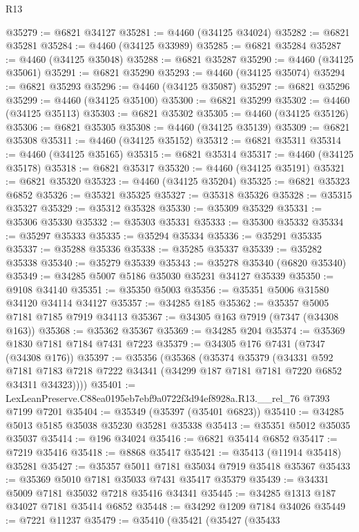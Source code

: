 \begin{lexlean}{R13}
\begin{coremodule}
@35279 := @6821 @34127
@35281 := @4460 (@34125 @34024)
@35282 := @6821 @35281
@35284 := @4460 (@34125 @33989)
@35285 := @6821 @35284
@35287 := @4460 (@34125 @35048)
@35288 := @6821 @35287
@35290 := @4460 (@34125 @35061)
@35291 := @6821 @35290
@35293 := @4460 (@34125 @35074)
@35294 := @6821 @35293
@35296 := @4460 (@34125 @35087)
@35297 := @6821 @35296
@35299 := @4460 (@34125 @35100)
@35300 := @6821 @35299
@35302 := @4460 (@34125 @35113)
@35303 := @6821 @35302
@35305 := @4460 (@34125 @35126)
@35306 := @6821 @35305
@35308 := @4460 (@34125 @35139)
@35309 := @6821 @35308
@35311 := @4460 (@34125 @35152)
@35312 := @6821 @35311
@35314 := @4460 (@34125 @35165)
@35315 := @6821 @35314
@35317 := @4460 (@34125 @35178)
@35318 := @6821 @35317
@35320 := @4460 (@34125 @35191)
@35321 := @6821 @35320
@35323 := @4460 (@34125 @35204)
@35325 := @6821 @35323 @6852
@35326 := @35321 @35325
@35327 := @35318 @35326
@35328 := @35315 @35327
@35329 := @35312 @35328
@35330 := @35309 @35329
@35331 := @35306 @35330
@35332 := @35303 @35331
@35333 := @35300 @35332
@35334 := @35297 @35333
@35335 := @35294 @35334
@35336 := @35291 @35335
@35337 := @35288 @35336
@35338 := @35285 @35337
@35339 := @35282 @35338
@35340 := @35279 @35339
@35343 := @35278 @35340 (@6820 @35340)
@35349 := @34285 @5007 @5186 @35030 @35231 @34127 @35339
@35350 := @9108 @34140
@35351 := @35350 @5003
@35356 := @35351 @5006 @31580 @34120 @34114 @34127
@35357 := @34285 @185
@35362 := @35357 @5005 @7181 @7185 @7919 @34113
@35367 := @34305 @163 @7919 (@7347 (@34308 @163))
@35368 := @35362 @35367
@35369 := @34285 @204
@35374 := @35369 @1830 @7181 @7184 @7431 @7223
@35379 := @34305 @176 @7431 (@7347 (@34308 @176))
@35397 := @35356
    (@35368
      (@35374
        @35379
        (@34331
          @592
          @7181
          @7183
          @7218
          @7222
          @34341
          (@34299 @187 @7181 @7181 @7220 @6852 @34311 @34323))))
@35401 := LexLeanPreserve.C88ea0195eb7ebf9a0722f3d94ef8928a.R13.__rel_76 @7393 @7199 @7201
@35404 := @35349 (@35397 (@35401 @6823))
@35410 := @34285 @5013 @5185 @35038 @35230 @35281 @35338
@35413 := @35351 @5012 @35035 @35037
@35414 := @196 @34024
@35416 := @6821 @35414 @6852
@35417 := @7219 @35416
@35418 := @8868 @35417
@35421 := @35413 (@11914 @35418) @35281
@35427 := @35357 @5011 @7181 @35034 @7919 @35418 @35367
@35433 := @35369 @5010 @7181 @35033 @7431 @35417 @35379
@35439 := @34331 @5009 @7181 @35032 @7218 @35416 @34341
@35445 := @34285 @1313 @187 @34027 @7181 @35414 @6852
@35448 := @34292 @1209 @7184 @34026
@35449 := @7221 @11237
@35479 := @35410
    (@35421
      (@35427
        (@35433

\end{coremodule}
\end{lexlean}
